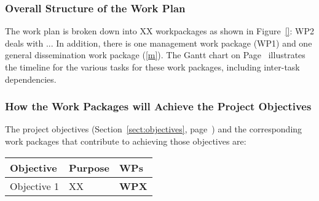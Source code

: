\documentclass[a4paper,11pt]{article}
\begin{document}

\subsubsection*{Overall Structure of the Work Plan}

The work plan is broken down into XX workpackages as shown
in Figure~\ref{}: WP2 deals with  ...
In addition, there is one management work package (WP1) and one
general dissemination work package (\ref{m}). The Gantt chart on
Page~\pageref{fig:gantt} illustrates the timeline for the
various tasks for these work packages, including inter-task
dependencies.

\subsubsection*{How the Work Packages will Achieve the Project Objectives}
\label{sssec:how_the_work_packages_will_achieve}


The project objectives (Section~\ref{sect:objectives},
page~\pageref{sect:objectives}) and the corresponding work
packages that contribute to achieving those objectives are:

\begin{center}
\begin{tabular}{|l|l|l|}\hline
\textbf{Objective} & \textbf{Purpose} & \textbf{WPs} \\\hline \hline
Objective 1 & XX & \textbf{WPX} \\\hline
\end{tabular}
\end{center}
\end{document}
